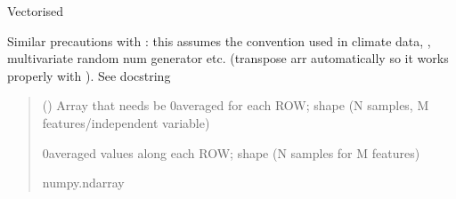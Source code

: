 \documentclass[letterpaper,10pt,english]{sphinxmanual}
\begin{document}
\begin{fulllineitems}
\label{\detokenize{kalman:glomar_gridding.autocorrelation.compute_autocorrelation.get_anomalies_vectorize}}
\pysigstartsignatures
\pysiglinewithargsret
{}
{}
{}
\pysigstopsignatures
\sphinxAtStartPar
Vectorised 

\sphinxAtStartPar
Similar precautions with :
this assumes the convention used in climate data,
, multivariate random num generator etc.
(transpose arr automatically so it works properly with ).
See  docstring
\begin{quote}\begin{description}
\sphinxAtStartPar
{} () \textendash{} Array that needs be 0\sphinxhyphen{}averaged for each ROW;
shape  (N samples, M features/independent variable)

\sphinxAtStartPar
{} \textendash{} 0\sphinxhyphen{}averaged values along each ROW;
shape  (N samples for M features)

\sphinxAtStartPar
numpy.ndarray

\end{description}\end{quote}

\end{fulllineitems}

\end{document}
